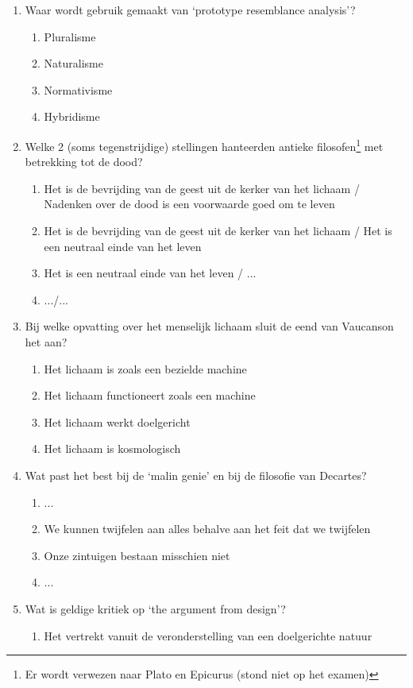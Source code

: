 \documentclass[kulak]{kulakarticle}
\begin{document}
\begin{enumerate}
		\item Waar wordt gebruik gemaakt van `prototype resemblance analysis'?
		\begin{enumerate}
			\item Pluralisme
			\item Naturalisme
			\item Normativisme
			\item Hybridisme
		\end{enumerate}
		\item Welke 2 (soms tegenstrijdige) stellingen hanteerden antieke filosofen\footnote{Er wordt verwezen naar Plato en Epicurus (stond niet op het examen)} met betrekking tot de dood?
		\begin{enumerate}
			\item Het is de bevrijding van de geest uit de kerker van het lichaam / Nadenken over de dood is een voorwaarde goed om te leven
			\item Het is de bevrijding van de geest uit de kerker van het lichaam / Het is een neutraal einde van het leven
			\item Het is een neutraal einde van het leven / ...
			\item .../...
		\end{enumerate}
		\item Bij welke opvatting over het menselijk lichaam sluit de eend van Vaucanson het aan?
		\begin{enumerate}
			\item Het lichaam is zoals een bezielde machine
			\item Het lichaam functioneert zoals een machine
			\item Het lichaam werkt doelgericht
			\item Het lichaam is kosmologisch
		\end{enumerate}
		\item Wat past het best bij de  `malin genie' en bij de filosofie van Decartes?
		\begin{enumerate}
			\item ...
			\item We kunnen twijfelen aan alles behalve aan het feit dat we twijfelen
			\item Onze zintuigen bestaan misschien niet
			\item ...
		\end{enumerate}
		\item Wat is geldige kritiek op `the argument from design'?
		\begin{enumerate}
			\item Het vertrekt vanuit de veronderstelling van een doelgerichte natuur

\end{enumerate}
\end{enumerate}
\end{document}
